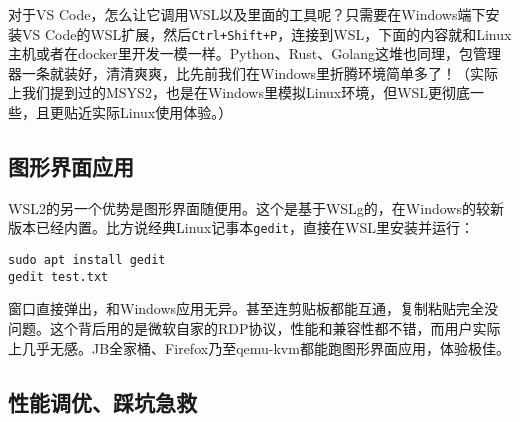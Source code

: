 对于VS Code，怎么让它调用WSL以及里面的工具呢？只需要在Windows端下安装VS Code的WSL扩展，然后\texttt{Ctrl+Shift+P}，连接到WSL，下面的内容就和Linux主机或者在docker里开发一模一样。Python、Rust、Golang这堆也同理，包管理器一条就装好，清清爽爽，比先前我们在Windows里折腾环境简单多了！（实际上我们提到过的MSYS2，也是在Windows里模拟Linux环境，但WSL更彻底一些，且更贴近实际Linux使用体验。）

\subsection{图形界面应用}

WSL2的另一个优势是图形界面随便用。这个是基于WSLg的，在Windows的较新版本已经内置。比方说经典Linux记事本\texttt{gedit}，直接在WSL里安装并运行：
\begin{lstlisting}
sudo apt install gedit
gedit test.txt
\end{lstlisting}
窗口直接弹出，和Windows应用无异。甚至连剪贴板都能互通，复制粘贴完全没问题。这个背后用的是微软自家的RDP协议，性能和兼容性都不错，而用户实际上几乎无感。JB全家桶、Firefox乃至qemu-kvm都能跑图形界面应用，体验极佳。

\subsection{性能调优、踩坑急救}

